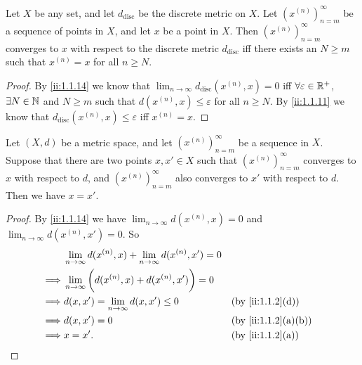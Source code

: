 \begin{prop}\label{ii:1.1.19}
  Let \(X\) be any set, and let \(d_{\text{disc}}\) be the discrete metric on \(X\).
  Let \((x^{(n)})_{n = m}^\infty\) be a sequence of points in \(X\), and let \(x\) be a point in \(X\).
  Then \((x^{(n)})_{n = m}^\infty\) converges to \(x\) with respect to the discrete metric \(d_{\text{disc}}\) iff there exists an \(N \geq m\) such that \(x^{(n)} = x\) for all \(n \geq N\).
\end{prop}

\begin{proof}
  By \cref{ii:1.1.14} we know that \(\lim_{n \to \infty} d_{\text{disc}}(x^{(n)}, x) = 0\) iff \(\forall \varepsilon \in \mathbb{R}^+\), \(\exists N \in \mathbb{N}\) and \(N \geq m\) such that \(d(x^{(n)}, x) \leq \varepsilon\) for all \(n \geq N\).
  By \cref{ii:1.1.11} we know that \(d_{\text{disc}}(x^{(n)}, x) \leq \varepsilon\) iff \(x^{(n)} = x\).
\end{proof}

\begin{prop}\label{ii:1.1.20}
  Let \((X, d)\) be a metric space, and let \((x^{(n)})_{n = m}^\infty\) be a sequence in \(X\).
  Suppose that there are two points \(x, x' \in X\) such that \((x^{(n)})_{n = m}^\infty\) converges to \(x\) with respect to \(d\), and \((x^{(n)})_{n = m}^\infty\) also converges to \(x'\) with respect to \(d\).
  Then we have \(x = x'\).
\end{prop}

\begin{proof}
  By \cref{ii:1.1.14} we have \(\lim_{n \to \infty} d(x^{(n)}, x) = 0\) and \(\lim_{n \to \infty} d(x^{(n)}, x') = 0\).
  So
  \begin{align*}
             & \lim_{n \to \infty} d(x^{(n)}, x) + \lim_{n \to \infty} d(x^{(n)}, x') = 0                         \\
    \implies & \lim_{n \to \infty} \bigg(d(x^{(n)}, x) + d(x^{(n)}, x')\bigg) = 0                                 \\
    \implies & d(x, x') = \lim_{n \to \infty} d(x, x') \leq 0                             &  & \by{ii:1.1.2}[d]   \\
    \implies & d(x, x') = 0                                                               &  & \by{ii:1.1.2}[a,b] \\
    \implies & x = x'.                                                                    &  & \by{ii:1.1.2}[a]
  \end{align*}
\end{proof}

